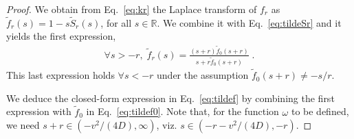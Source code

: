 \documentclass[10pt,a4paper]{amsart}
\begin{document}
\begin{proof}
    We obtain from Eq.~\eqref{eq:kr} the Laplace transform of $f_r$ as
$\tilde{f}_r(s)=1-s\tilde{S}_r(s)$, for all $s \in \mathbb{R}$.
We combine it with Eq.~\eqref{eq:tildeSr} and it yields the first 
expression,
\begin{align*}
\forall s > -r, 	\; \tilde{f}_r(s)=\frac{(s+r)\tilde{f}_0(s+r)}{s+r\tilde{f}_0(s+r)}
 \; .
 \end{align*}
 This last expression holds $\forall s < -r$ under the assumption $ \tilde{f}_0(s+r)\neq -s/r$.  

We deduce the closed-form expression 
 in Eq.~\eqref{eq:tildef}
 by combining the first expression with $\tilde f_0$ in Eq.~\eqref{eq:tildef0}. Note that, for the function $\omega$ to be defined, we need $s+r \in \left(-v^2/(4D),\infty \right)$, viz. $s \in \left(- r -v^2/(4D), -r \right)$. 
\end{proof}
\end{document}
